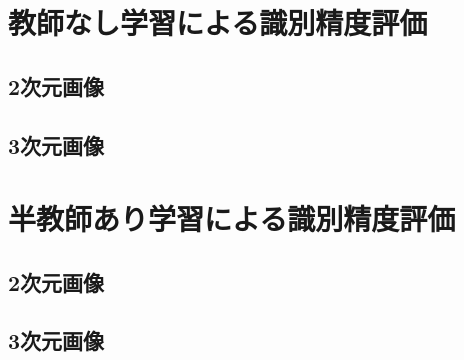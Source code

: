 \section{教師なし学習による識別精度評価}
\subsection*{2次元画像}
\subsection*{3次元画像}

\section{半教師あり学習による識別精度評価}
\subsection*{2次元画像}
\subsection*{3次元画像}

